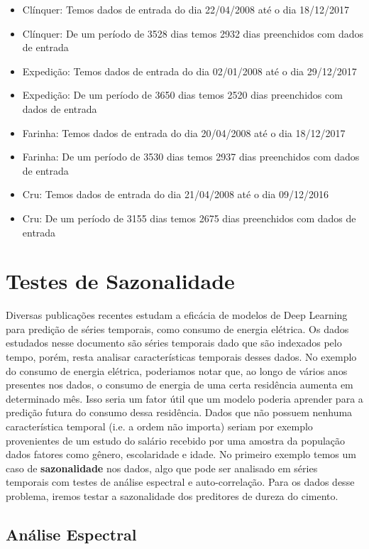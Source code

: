 \begin{itemize}
\item Clínquer: Temos dados de entrada do dia 22/04/2008 até o dia 18/12/2017
\item Clínquer: De um período de 3528 dias temos 2932 dias preenchidos com dados de entrada
\item Expedição: Temos dados de entrada do dia 02/01/2008 até o dia 29/12/2017
\item Expedição: De um período de 3650 dias temos 2520 dias preenchidos com dados de entrada
\item Farinha: Temos dados de entrada do dia 20/04/2008 até o dia 18/12/2017
\item Farinha: De um período de 3530 dias temos 2937 dias preenchidos com dados de entrada
\item Cru: Temos dados de entrada do dia 21/04/2008 até o dia 09/12/2016
\item Cru: De um período de 3155 dias temos 2675 dias preenchidos com dados de entrada
\end{itemize}


\section{Testes de Sazonalidade}

Diversas publicações recentes estudam a eficácia de modelos de Deep Learning para predição de séries temporais, como consumo de energia elétrica. Os dados estudados nesse documento são séries temporais dado que são indexados pelo tempo, porém, resta analisar características temporais desses dados. No exemplo do consumo de energia elétrica, poderiamos notar que, ao longo de vários anos presentes nos dados, o consumo de energia de uma certa residência aumenta em determinado mês. Isso seria um fator útil que um modelo poderia aprender para a predição futura do consumo dessa residência. Dados que não possuem nenhuma característica temporal (i.e. a ordem não importa) seriam por exemplo provenientes de um estudo do salário recebido por uma amostra da população dados fatores como gênero, escolaridade e idade. No primeiro exemplo temos um caso de \textbf{sazonalidade} nos dados, algo que pode ser analisado em séries temporais com testes de análise espectral e auto-correlação. Para os dados desse problema, iremos testar a sazonalidade dos preditores de dureza do cimento.

\subsection{Análise Espectral}

